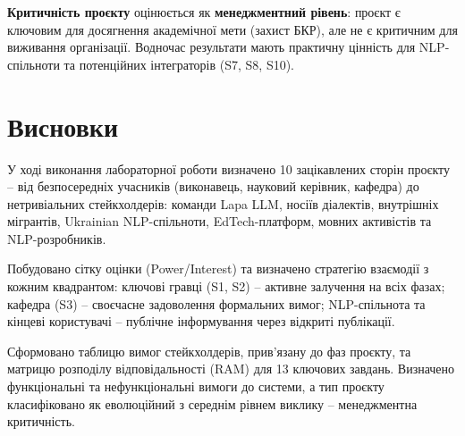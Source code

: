 \documentclass[14pt]{extarticle}
\begin{document}
\textbf{Критичність проєкту} оцінюється як \textbf{менеджментний рівень}: проєкт є ключовим для досягнення академічної мети (захист БКР), але не є критичним для виживання організації. Водночас результати мають практичну цінність для NLP-спільноти та потенційних інтеграторів (S7, S8, S10).

\section*{Висновки}

У ході виконання лабораторної роботи визначено 10 зацікавлених сторін проєкту -- від безпосередніх учасників (виконавець, науковий керівник, кафедра) до нетривіальних стейкхолдерів: команди Lapa LLM, носіїв діалектів, внутрішніх мігрантів, Ukrainian NLP-спільноти, EdTech-платформ, мовних активістів та NLP-розробників.

Побудовано сітку оцінки (Power/Interest) та визначено стратегію взаємодії з кожним квадрантом: ключові гравці (S1, S2) -- активне залучення на всіх фазах; кафедра (S3) -- своєчасне задоволення формальних вимог; NLP-спільнота та кінцеві користувачі -- публічне інформування через відкриті публікації.

Сформовано таблицю вимог стейкхолдерів, прив'язану до фаз проєкту, та матрицю розподілу відповідальності (RAM) для 13 ключових завдань. Визначено функціональні та нефункціональні вимоги до системи, а тип проєкту класифіковано як еволюційний з середнім рівнем виклику -- менеджментна критичність.
\end{document}
